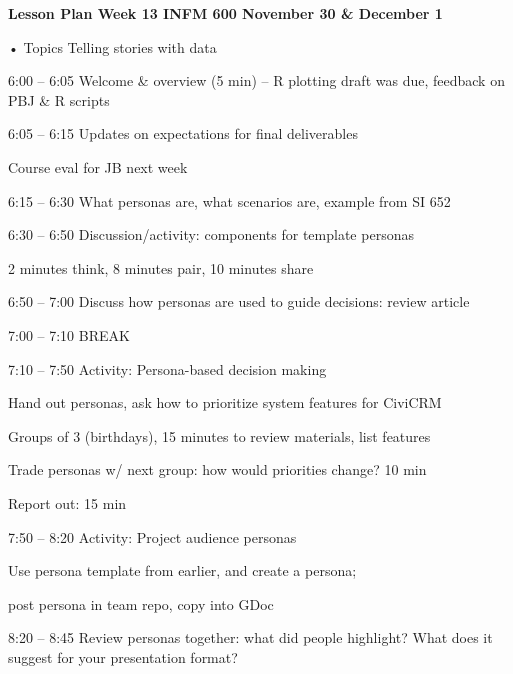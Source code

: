 \documentclass[]{article}
\date{}
\begin{document}
\textbf{Lesson Plan Week 13 INFM 600 November 30 \& December 1 }

• Topics Telling stories with data

6:00 -- 6:05 Welcome \& overview (5 min) -- R plotting draft was due,
feedback on PBJ \& R scripts

6:05 -- 6:15 Updates on expectations for final deliverables

Course eval for JB next week

6:15 -- 6:30 What personas are, what scenarios are, example from SI 652

6:30 -- 6:50 Discussion/activity: components for template personas

2 minutes think, 8 minutes pair, 10 minutes share

6:50 -- 7:00 Discuss how personas are used to guide decisions: review
article

7:00 -- 7:10 BREAK

7:10 -- 7:50 Activity: Persona-based decision making

Hand out personas, ask how to prioritize system features for CiviCRM

Groups of 3 (birthdays), 15 minutes to review materials, list features

Trade personas w/ next group: how would priorities change? 10 min

Report out: 15 min

7:50 -- 8:20 Activity: Project audience personas

Use persona template from earlier, and create a persona;

post persona in team repo, copy into GDoc

8:20 -- 8:45 Review personas together: what did people highlight? What
does it suggest for your presentation format?
\end{document}
